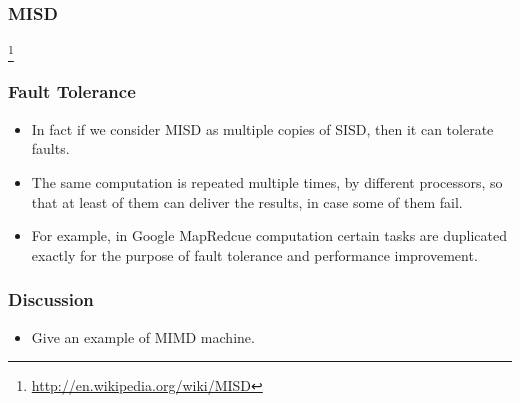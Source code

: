 \documentclass{beamer}
\begin{document}
\begin{CJK}{UTF8}{bsmi}
\begin{frame}
\frametitle{MISD}
\centerline{}
\footnote{\url{http://en.wikipedia.org/wiki/MISD}}
\end{frame}

\begin{frame}
\frametitle{Fault Tolerance}
\begin{itemize}
\item In fact if we consider MISD as multiple copies of SISD, then it
  can tolerate faults.
\item The same computation is repeated multiple times, by different
  processors, so that at least of them can deliver the results, in
  case some of them fail.
\item For example, in Google MapRedcue computation certain tasks are
  duplicated exactly for the purpose of fault tolerance and
  performance improvement.
\end{itemize}
\end{frame}

\begin{frame}
\frametitle{Discussion}
\begin{itemize}
\item Give an example of MIMD machine.
\end{itemize}
\end{frame}

\end{CJK}
\end{document}

